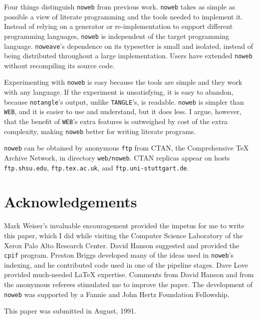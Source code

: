 Four things distinguish {\tt noweb} from previous work.
{\tt noweb} takes as simple as possible a view of literate programming
and the tools needed to implement it. 
Instead of relying on a generator or re-implementation to support
different programming languages, {\tt noweb} is independent of the
target programming language.
{\tt noweave}'s dependence on its typesetter is small and isolated,
instead of being distributed throughout a large implementation.
Users have extended {\tt noweb} without recompiling its source code.

Experimenting with {\tt noweb} is easy because the tools are simple
and they work with any language.
If the experiment is unsatisfying, it is easy to abandon, because 
\verb+notangle+'s output, unlike {\tt TANGLE}'s, is readable.
\verb+noweb+ is simpler than {\tt WEB}, and it is easier to use and
understand, but it does less.
I argue, however, that the benefit of {\tt WEB}'s extra features is
outweighed by cost of the extra complexity,
making \verb+noweb+  better for writing literate programs.

\verb+noweb+ can be obtained by 
anonymous {\tt ftp} from CTAN,
the Comprehensive {\TeX} 
Archive Network, in directory {\tt web/noweb}.  CTAN replicas appear
on 
hosts {\tt ftp.shsu.edu}, {\tt ftp.tex.ac.uk}, and {\tt ftp.uni-stuttgart.de}.

\section{Acknowledgements}
Mark Weiser's invaluable encouragement provided the impetus for me to
write this paper, which I did while visiting the Computer
Science Laboratory of the Xerox Palo Alto Research Center.
David Hanson suggested and provided the \verb+cpif+ program.
Preston Briggs developed many of the ideas used in \verb+noweb+'s
indexing, and he contributed code used in one of the pipeline stages.
Dave Love provided much-needed {\LaTeX} expertise.
Comments from David Hanson and from the anonymous referees stimulated
me to improve the paper.
The development of {\tt noweb} was supported by a Fannie and John Hertz
Foundation Fellowship.

This paper was submitted in August, 1991.




\clearpage
{}	%




